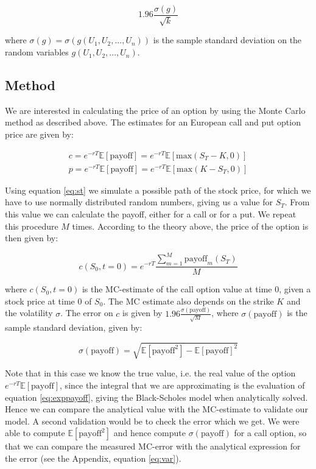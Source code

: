 \documentclass[11pt,a4paper]{article}
\begin{document}
\begin{equation}
  \label{eq:stderror}
  1.96\frac{\sigma(g)}{\sqrt{k}}
\end{equation}

where $\sigma(g) = \sigma(g(U_1,U_2,...,U_n))$ is the sample standard deviation on the random variables $g(U_1,U_2,...,U_n)$.

\subsection{Method}
We are interested in calculating the price of an option by using the Monte Carlo method as described above. The estimates for an European call and put option price are given by:

\begin{align}
  \label{eq:exppayoff}
  c = e^{-rT}\mathbb{E}[\text{payoff}] = e^{-rT}\mathbb{E}[\text{max}(S_T - K,0)] \nonumber \\
  p = e^{-rT}\mathbb{E}[\text{payoff}] = e^{-rT}\mathbb{E}[\text{max}(K - S_T,0)]
\end{align}

Using equation \ref{eq:st} we simulate a possible path of the stock price, for which we have to use normally distributed random numbers, giving us a value for $S_T$. From this value we can calculate the payoff, either for a call or for a put. We repeat this procedure $M$ times. According to the theory above, the price of the option is then given by:

\begin{equation}
  \label{eq:price}
  c(S_0,t=0) = e^{-rT} \frac{\sum_{m=1}^M\text{payoff}_m (S_T)}{M}
\end{equation}

where $c(S_0,t=0)$ is the MC-estimate of the call option value at time 0, given a stock price at time 0 of $S_0$. The MC estimate also depends on the strike $K$ and the volatility $\sigma$. The error on $c$ is given by $1.96\frac{\sigma(\text{payoff})}{\sqrt{M}}$, where $\sigma(\text{payoff})$ is the sample standard deviation, given by:

\begin{equation}
  \sigma(\text{payoff}) = \sqrt{\mathbb{E}[\text{payoff}^2] - \mathbb{E}[\text{payoff}]^2}
\end{equation}

Note that in this case we know the true value, i.e. the real value of the option $e^{-rT}\mathbb{E}[\text{payoff}]$, since the integral that we are approximating is the evaluation of equation \ref{eq:exppayoff}, giving the Black-Scholes model when analytically solved. Hence we can compare the analytical value with the MC-estimate to validate our model. A second validation would be to check the error which we get. We were able to compute $\mathbb{E}[\text{payoff}^2]$ and hence compute $\sigma(\text{payoff})$ for a call option, so that we can compare the measured MC-error with the analytical expression for the error (see the Appendix, equation \ref{eq:var}).
\end{document}
